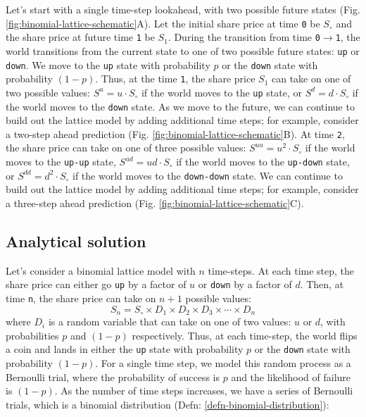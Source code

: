 \documentclass[11pt]{article}
\theoremstyle{definition}
\begin{document}
Let's start with a single time-step lookahead, with two possible future states (Fig. \ref{fig:binomial-lattice-schematic}A).
Let the initial share price at time \texttt{0} be $S_{\circ}$ and the share price at future time \texttt{1} be $S_{1}$.
During the transition from time \texttt{0}$\rightarrow$\texttt{1}, the world transitions from the current state to one of two possible future states: \texttt{up} or \texttt{down}.
We move to the \texttt{up} state with probability $p$ or the \texttt{down} state with probability $(1-p)$.
Thus, at the time \texttt{1}, the share price $S_{1}$ can take on one of two possible values: $S^{u} = u\cdot{S_{\circ}}$ if the world moves 
to the \texttt{up} state, or $S^{d} = d\cdot{S_{\circ}}$ if the world moves to the \texttt{down} state. 
As we move to the future, we can continue to build out the lattice model by adding additional time steps; for example, consider a two-step ahead prediction (Fig. \ref{fig:binomial-lattice-schematic}B). 
At time \texttt{2}, the share price can take on one of three possible values: $S^{uu} = u^{2}\cdot{S_{\circ}}$ if the world moves
to the \texttt{up-up} state, $S^{ud} = ud\cdot{S_{\circ}}$ if the world moves to the \texttt{up-down} state, or $S^{dd} = d^{2}\cdot{S_{\circ}}$ if the world moves to the \texttt{down-down} state.
We can continue to build out the lattice model by adding additional time steps; for example, consider a three-step ahead prediction (Fig. \ref{fig:binomial-lattice-schematic}C).

\subsection{Analytical solution}
Let's consider a binomial lattice model with $n$ time-steps. At each time step, the share price can either go \texttt{up} by a factor of $u$ or \texttt{down} by a factor of $d$.
Then, at time \texttt{n}, the share price can take on $n+1$ possible values: 
\begin{equation}
	S_{n} = S_{\circ}\times{D_{1}}\times{D_{2}}\times{D_{3}}\times\cdots\times{D_{n}}
\end{equation}
where $D_{i}$ is a random variable that can take on one of two values: $u$ or $d$, 
with probabilities $p$ and $(1-p)$ respectively. 
Thus, at each time-step, the world flips a coin and lands in either the \texttt{up} state with probability $p$ or the \texttt{down} state with probability $(1-p)$.
For a single time step, we model this random process as a Bernoulli trial, where the probability of success is $p$ and the likelihood of failure is $(1-p)$.
As the number of time steps increases, we have a series of Bernoulli trials, which is a binomial distribution (Defn: \ref{defn-binomial-distribution}):
\end{document}
